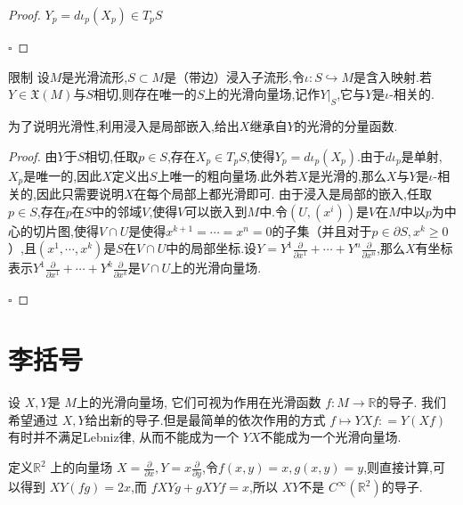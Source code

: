\documentclass[../../几何与拓扑.tex]{subfiles}
\begin{document}
\begin{proof}
    $Y_{p}=d \iota _{p}\left( X_{p} \right) \in T_{p}S$

    \hfill $\square$
\end{proof}
\begin{proposition}{限制}\label{相切与限制}
    设$M$是光滑流形,$S\subset M$是（带边）浸入子流形,令$\iota:S \hookrightarrow M$是含入映射.若$Y \in \mathfrak{X}\left( M \right)$与$S$相切,则存在唯一的$S$上的光滑向量场,记作$Y|_{S}$,它与$Y$是$\iota$-相关的.
\end{proposition}
\begin{note}

    为了说明光滑性,利用浸入是局部嵌入,给出$X$继承自$Y$的光滑的分量函数.

\end{note}
\begin{proof}
    由$Y$于$S$相切,任取$p \in S$,存在$X_{p}\in T_{p}S$,使得$Y_{p}= d \iota _{p}\left( X_{p} \right)$.由于$d\iota _{p}$是单射,$X_{p}$是唯一的,因此$X$定义出$S$上唯一的粗向量场.此外若$X$是光滑的,那么$X$与$Y$是$\iota$-相关的,因此只需要说明$X$在每个局部上都光滑即可.
由于浸入是局部的嵌入,任取$p \in S$,存在$p$在$S$中的邻域$V$,使得$V$可以嵌入到$M$中.令$\left( U,\left( x^{i} \right) \right)$是$V$在$M$中以$p$为中心的切片图,使得$V\cap U$是使得$x^{k+1}={\cdots}= x^{n}= 0$的子集（并且对于$p \in \partial S,x^{k}\geqslant 0$）,且$\left( x^{1},{\cdots},x^{k} \right)$是$S$在$V\cap U$中的局部坐标.设$Y= Y^{1}\frac{ \partial  }{ \partial x^{1} }+{\cdots}+Y^{n}\frac{ \partial  }{ \partial x^{n} }$,那么$X$有坐标表示$Y^{1}\frac{ \partial  }{ \partial x^{1} }+{\cdots}+Y^{k}\frac{ \partial  }{ \partial x^{k} }$是$V\cap U$上的光滑向量场.

    \hfill $\square$
\end{proof}


\section{李括号}

设 \(  X,Y  \)是 \(  M  \)上的光滑向量场, 它们可视为作用在光滑函数 \(  f: M\to \mathbb{R}   \)的导子.
我们希望通过 \(  X,Y  \)给出新的导子.但是最简单的依次作用的方式 \(  f\mapsto YXf: =  Y\left( Xf \right)   \)有时并不满足Lebniz律, 从而不能成为一个 \(  YX  \)不能成为一个光滑向量场.      
\begin{example}
    定义\(  \mathbb{R} ^{2}  \) 上的向量场 \(  X = \frac{\partial }{\partial x},Y =  x \frac{\partial }{\partial y}  \),令\(  f\left( x,y \right)= x, g\left( x,y \right)= y    \),则直接计算,可以得到
     \(  XY\left( fg \right)= 2x   \),而 \(  fXYg+ gXYf= x  \),所以 \(  XY  \)不是 \(  C^{\infty }\left( \mathbb{R} ^{2} \right)  \)的导子.      

\end{example}
\end{document}
